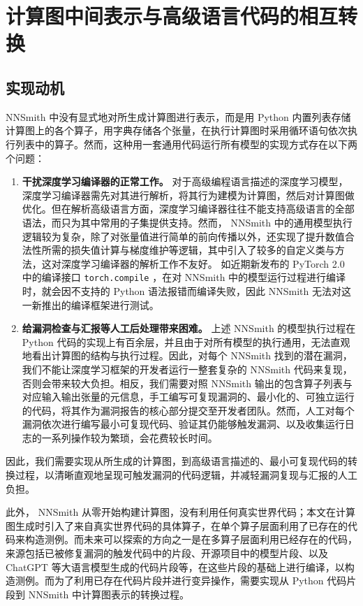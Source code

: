
\chapter{计算图中间表示与高级语言代码的相互转换}

\section{实现动机}

NNSmith 中没有显式地对所生成计算图进行表示，而是用 Python 内置列表存储计算图上的各个算子，用字典存储各个张量，在执行计算图时采用循环语句依次执行列表中的算子。然而，这种用一套通用代码运行所有模型的实现方式存在以下两个问题：
\begin{enumerate}
    \item \textbf{干扰深度学习编译器的正常工作。} 对于高级编程语言描述的深度学习模型，深度学习编译器需先对其进行解析，将其行为建模为计算图，然后对计算图做优化。但在解析高级语言方面，深度学习编译器往往不能支持高级语言的全部语法，而只为其中常用的子集提供支持。然而， NNSmith 中的通用模型执行逻辑较为复杂，除了对张量值进行简单的前向传播以外，还实现了提升数值合法性所需的损失值计算与梯度维护等逻辑，其中引入了较多的自定义类与方法，这对深度学习编译器的解析工作不友好。
    如近期新发布的 PyTorch 2.0 \cite{pt2_release} 中的编译接口 \texttt{torch.compile} ，在对 NNSmith 中的模型运行过程进行编译时，就会因不支持的 Python 语法报错而编译失败，因此 NNSmith 无法对这一新推出的编译框架进行测试。
    \item \textbf{给漏洞检查与汇报等人工后处理带来困难。} 上述 NNSmith 的模型执行过程在 Python 代码的实现上有百余层，并且由于对所有模型的执行通用，无法直观地看出计算图的结构与执行过程。因此，对每个 NNSmith 找到的潜在漏洞，我们不能让深度学习框架的开发者运行一整套复杂的 NNSmith 代码来复现，否则会带来较大负担。相反，我们需要对照 NNSmith 输出的包含算子列表与对应输入输出张量的元信息，手工编写可复现漏洞的、最小化的、可独立运行的代码，将其作为漏洞报告的核心部分提交至开发者团队。然而，人工对每个漏洞依次进行编写最小可复现代码、验证其仍能够触发漏洞、以及收集运行日志的一系列操作较为繁琐，会花费较长时间。
\end{enumerate}
因此，我们需要实现从所生成的计算图，到高级语言描述的、最小可复现代码的转换过程，以清晰直观地呈现可触发漏洞的代码逻辑，并减轻漏洞复现与汇报的人工负担。

此外， NNSmith 从零开始构建计算图，没有利用任何真实世界代码；本文在计算图生成时引入了来自真实世界代码的具体算子，在单个算子层面利用了已存在的代码来构造测例。而未来可以探索的方向之一是在多算子层面利用已经存在的代码，来源包括已被修复漏洞的触发代码中的片段、开源项目中的模型片段、以及 ChatGPT \cite{chatgpt} 等大语言模型生成的代码片段等，在这些片段的基础上进行编译，以构造测例。而为了利用已存在代码片段并进行变异操作，需要实现从 Python 代码片段到 NNSmith 中计算图表示的转换过程。

